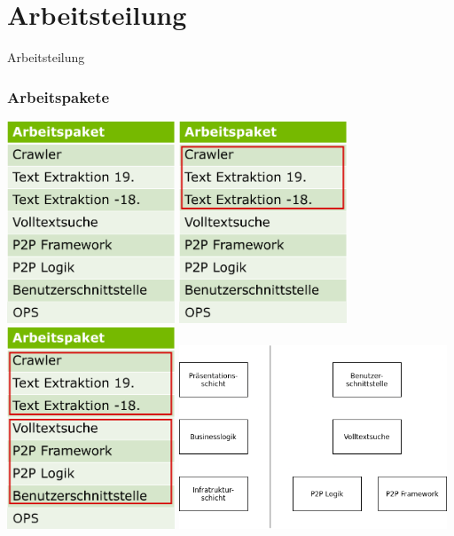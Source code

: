 \documentclass{beamer}
\begin{document}
\section{Arbeitsteilung}
\begin{frame}
  \begin{center}
    {\Huge Arbeitsteilung}
  \end{center}
\end{frame}

\begin{frame}[allowframebreaks]
  \frametitle{Arbeitspakete}

  \includegraphics[width=5cm]{Arbeitspakete}
  \break
  \includegraphics[width=5cm]{Arbeitspakete-Crawler}
  \break
  \includegraphics[width=5cm]{Arbeitspakete-Main}
  \break
  \includegraphics[width=8cm]{Schichten}
\end{frame}
\end{document}
